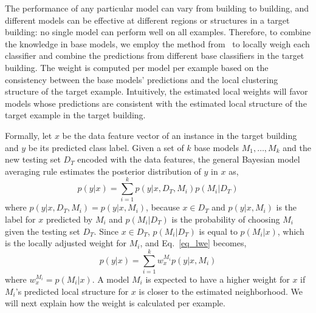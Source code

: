 The performance of any particular model can vary from building to building, and different models can be effective at different regions or structures in a target building: no single model can perform well on all examples.
Therefore, to combine the knowledge in base models,
we employ the method from~\cite{lwe} to locally weigh each classifier and combine the predictions from different base classifiers in the target building.
The weight is computed per model per example based on the consistency between the base models' predictions and the local clustering structure of the target example.
Intuitively, the estimated local weights will favor models whose predictions are consistent with the estimated local structure of the target example in the target building.

Formally, let $x$ be the data feature vector of an instance in the target building and $y$ be its predicted class label. Given a set of $k$ base models $M_1, \dots, M_k$ and the new testing set $D_T$ encoded with the data features, the general Bayesian model averaging rule estimates the posterior distribution of $y$ in $x$ as,
\begin{equation}\label{eq_lwe}
p(y|x)=\sum_{i=1}^k p(y|x,D_T,M_i) p(M_i|D_T)
\end{equation}
where $p(y|x,D_T,M_i) = p(y|x,M_i)$, because $x \in D_T$ and $p(y|x,M_i)$ is the label for $x$ predicted by $M_i$ and $p(M_i|D_T)$ is the probability of choosing $M_i$ given the testing set $D_T$.
Since $x \in D_T$, $p(M_i|D_T)$ is equal to $p(M_i|x)$, which is the locally adjusted weight for $M_i$, and Eq.~\ref{eq_lwe} becomes,
\begin{equation}\label{eq_sum}
p(y|x)=\sum_{i=1}^k w_{x}^{M_i} p(y|x, M_i)
\end{equation}
where $w_{x}^{M_i} = p(M_i|x)$.  A model $M_i$ is expected to have a higher weight for $x$ if $M_i$'s predicted local structure for $x$ is closer to the estimated neighborhood.
We will next explain how the weight is calculated per example.

